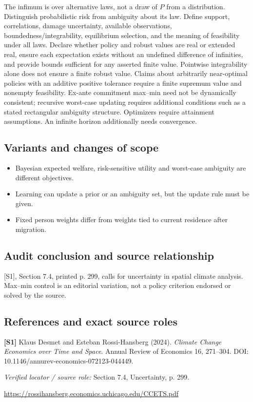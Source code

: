 \documentclass[11pt,a4paper]{article}
\begin{document}
The infimum is over alternative laws, not a draw of \(P\) from a distribution. Distinguish probabilistic risk from ambiguity about its law. Define support, correlations, damage uncertainty, available observations, boundedness/integrability, equilibrium selection, and the meaning of feasibility under all laws. Declare whether policy and robust values are real or extended real, ensure each expectation exists without an undefined difference of infinities, and provide bounds sufficient for any asserted finite value. Pointwise integrability alone does not ensure a finite robust value. Claims about arbitrarily near-optimal policies with an additive positive tolerance require a finite supremum value and nonempty feasibility. Ex-ante commitment max--min need not be dynamically consistent; recursive worst-case updating requires additional conditions such as a stated rectangular ambiguity structure. Optimizers require attainment assumptions. An infinite horizon additionally needs convergence.

\subsection*{Variants and changes of scope}

\begin{itemize}
\item Bayesian expected welfare, risk-sensitive utility and worst-case ambiguity are different objectives.
\item Learning can update a prior or an ambiguity set, but the update rule must be given.
\item Fixed person weights differ from weights tied to current residence after migration.
\end{itemize}

\subsection*{Audit conclusion and source relationship}

[S1], Section 7.4, printed p. 299, calls for uncertainty in spatial climate analysis. Max--min control is an editorial variation, not a policy criterion endorsed or solved by the source.

\subsection*{References and exact source roles}

{\footnotesize\raggedright
\par\noindent\textbf{[S1]} Klaus Desmet and Esteban Rossi-Hansberg (2024). \emph{Climate Change Economics over Time and Space}. Annual Review of Economics 16, 271–304. DOI: 10.1146/annurev-economics-072123-044449.\par \textit{Verified locator / source role:} Section 7.4, Uncertainty, p. 299.\par \url{https://rossihansberg.economics.uchicago.edu/CCETS.pdf}\par\smallskip
}
\end{document}
